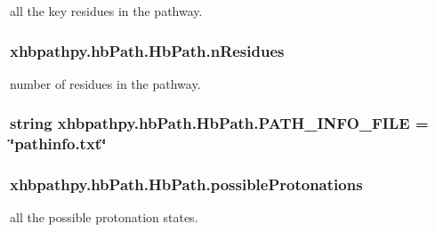 all the key residues in the pathway. 

\hypertarget{classxhbpathpy_1_1hb_path_1_1_hb_path_a57b7e261f0510a0793102eecffd8bb62}{
\subsubsection[{n\-Residues}]{\setlength{\rightskip}{0pt plus 5cm}xhbpathpy.\-hb\-Path.\-Hb\-Path.\-n\-Residues}}\label{classxhbpathpy_1_1hb_path_1_1_hb_path_a57b7e261f0510a0793102eecffd8bb62}


number of residues in the pathway. 

\hypertarget{classxhbpathpy_1_1hb_path_1_1_hb_path_aad2661f44ffc401393a1e8f017ffdb61}{
\subsubsection[{P\-A\-T\-H\-\_\-\-I\-N\-F\-O\-\_\-\-F\-I\-L\-E}]{\setlength{\rightskip}{0pt plus 5cm}string xhbpathpy.\-hb\-Path.\-Hb\-Path.\-P\-A\-T\-H\-\_\-\-I\-N\-F\-O\-\_\-\-F\-I\-L\-E = \char`\"{}pathinfo.\-txt\char`\"{}\hspace{0.3cm}{\ttfamily [static]}}}\label{classxhbpathpy_1_1hb_path_1_1_hb_path_aad2661f44ffc401393a1e8f017ffdb61}
\hypertarget{classxhbpathpy_1_1hb_path_1_1_hb_path_a63c9f028abbc09e92aefbf4b65d00052}{
\subsubsection[{possible\-Protonations}]{\setlength{\rightskip}{0pt plus 5cm}xhbpathpy.\-hb\-Path.\-Hb\-Path.\-possible\-Protonations}}\label{classxhbpathpy_1_1hb_path_1_1_hb_path_a63c9f028abbc09e92aefbf4b65d00052}


all the possible protonation states. 

